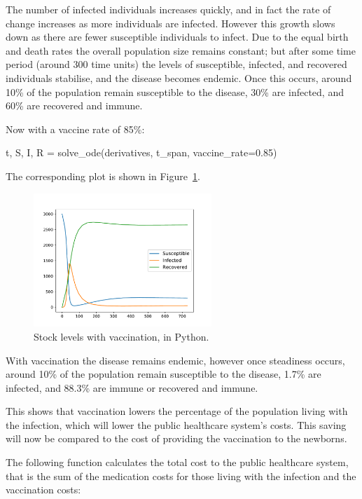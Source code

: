 The number of infected individuals increases quickly, and in fact the rate of
change increases as more individuals are infected. However this growth slows
down as there are fewer susceptible individuals to infect. Due to the equal
birth and death rates the overall population size remains constant; but after
some time period (around 300 time units) the levels of susceptible, infected,
and recovered individuals stabilise, and the disease becomes endemic. Once this
occurs, around 10\% of the population remain susceptible to the disease, 30\%
are infected, and 60\% are recovered and immune.

Now with a vaccine rate of 85\%:

\begin{pyin}
t, S, I, R = solve_ode(derivatives, t_span, vaccine_rate=0.85)
\end{pyin}

The corresponding plot is shown in Figure~\ref{fig:plot_with_vaccine}.

\begin{figure}
\begin{center}
\includegraphics[width=0.6\textwidth]{./assets/sd_vaccine_plots/plot_with_vaccine_python.pdf}
\end{center}
\caption{Stock levels with vaccination, in Python.}
\label{fig:plot_with_vaccine}
\end{figure}

With vaccination the disease remains endemic, however once steadiness occurs,
around 10\% of the population remain susceptible to the disease, 1.7\% are
infected, and 88.3\% are immune or recovered and immune.

This shows that vaccination lowers the percentage of the population living with
the infection, which will lower the public healthcare system's costs. This
saving will now be compared to the cost of providing the vaccination to the
newborns.

The following function calculates the total cost to the public healthcare
system, that is the sum of the medication costs for those living with the
infection and the vaccination costs:


